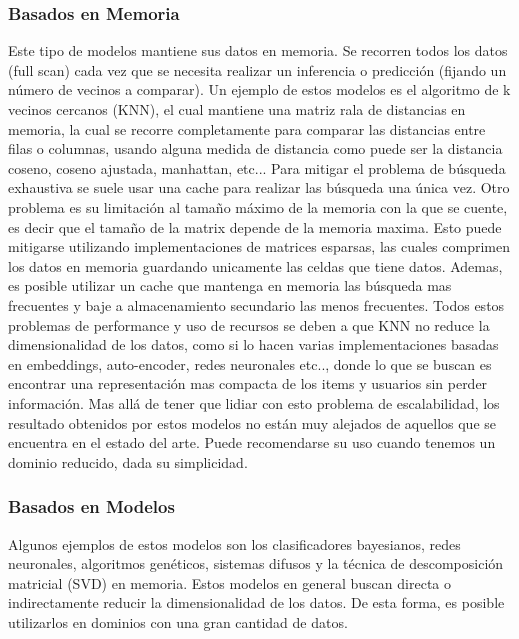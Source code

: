 \documentclass[11pt,a4paper,twoside]{thesis}
\begin{document}
 \subsubsection{Basados en Memoria} 
 
 Este tipo de modelos mantiene sus datos en memoria. Se recorren todos los datos (full scan) cada vez que se necesita realizar un inferencia o predicción (fijando un número de vecinos a comparar). Un ejemplo de estos modelos es el algoritmo de k vecinos cercanos (KNN), el cual mantiene una matriz rala de distancias en memoria, la cual se recorre completamente para comparar las distancias entre filas o columnas, usando alguna medida de distancia como puede ser la distancia coseno, coseno ajustada, manhattan, etc... Para mitigar el problema de búsqueda exhaustiva se suele usar una cache para realizar las búsqueda una única vez. Otro problema es su limitación al tamaño máximo de la memoria con la que se cuente, es decir que el tamaño de la matrix depende de la memoria maxima. Esto puede mitigarse utilizando implementaciones de matrices esparsas, las cuales comprimen los datos en memoria guardando unicamente las celdas que tiene datos. Ademas, es posible utilizar un cache que mantenga en memoria las búsqueda mas frecuentes y baje a almacenamiento secundario las menos frecuentes. Todos estos problemas de performance y uso de recursos se deben a que KNN no reduce la dimensionalidad de los datos, como si lo hacen varias implementaciones basadas en embeddings, auto-encoder, redes neuronales etc.., donde lo que se buscan es encontrar una representación mas compacta de los items y usuarios sin perder información. Mas allá de tener que lidiar con esto problema de escalabilidad, los resultado obtenidos por estos modelos no están muy alejados de aquellos que se encuentra en el estado del arte. Puede recomendarse su uso cuando tenemos un dominio reducido, dada su simplicidad. 

 \subsubsection{Basados en Modelos}
 
Algunos ejemplos de estos modelos son los clasificadores bayesianos, redes neuronales, algoritmos genéticos, sistemas difusos y la técnica de descomposición matricial (SVD) en memoria. Estos modelos en general buscan directa o indirectamente reducir la dimensionalidad de los datos. De esta forma, es posible utilizarlos en dominios con una gran cantidad de datos.
\end{document}
